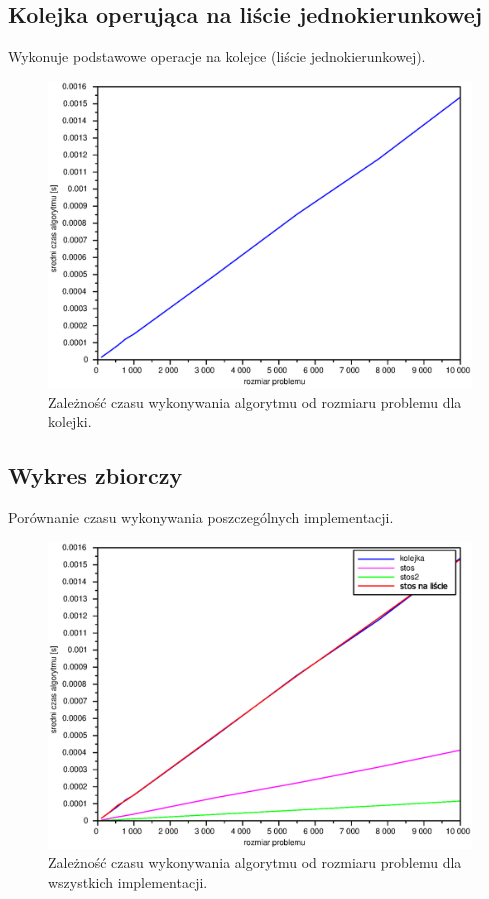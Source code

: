 \documentclass{mwart}
\begin{document}
\newpage
\subsection {Kolejka operująca na liście jednokierunkowej}
Wykonuje podstawowe operacje na kolejce (liście jednokierunkowej).

\begin{figure}[!htp]
\centering
\includegraphics[width=\textwidth]{files/queue.eps}
\caption{Zależność czasu wykonywania algorytmu od rozmiaru problemu dla kolejki. \label{queue}} 
\end{figure}

\newpage
\subsection {Wykres zbiorczy}
Porównanie czasu wykonywania poszczególnych implementacji.

\begin{figure}[!htp]
\centering
\includegraphics[width=\textwidth]{files/all.eps}
\caption{Zależność czasu wykonywania algorytmu od rozmiaru problemu dla wszystkich implementacji. \label{all}} 
\end{figure}
\end{document}
